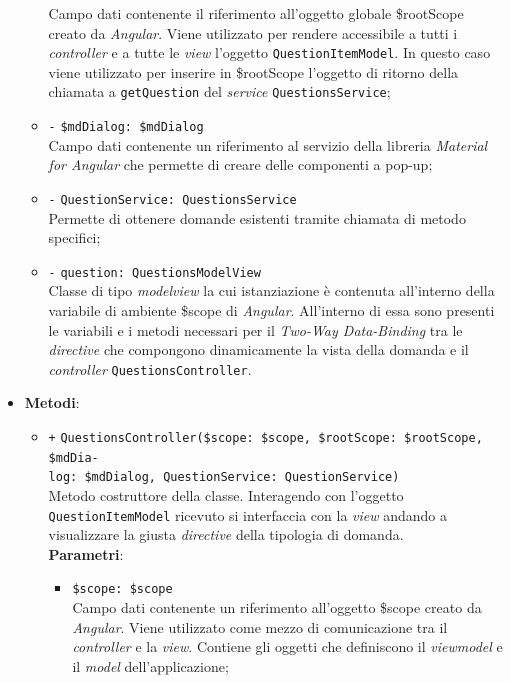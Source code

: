 \begin{itemize}
\begin{itemize}
		Campo dati contenente il riferimento all'oggetto globale \$rootScope creato da \textit{Angular}. Viene utilizzato per rendere accessibile a tutti i \textit{controller} e a tutte le \textit{view} l'oggetto \texttt{QuestionItemModel}. In questo caso viene utilizzato per inserire in \$rootScope l'oggetto di ritorno della chiamata a \texttt{getQuestion} del \textit{service} \texttt{QuestionsService};
		\item \texttt{-} \texttt{\$mdDialog: \$mdDialog} \\
		Campo dati contenente un riferimento al servizio della libreria \textit{Material for Angular} che permette di creare delle componenti a pop-up;
		\item \texttt{-} \texttt{QuestionService: QuestionsService}\\ Permette di ottenere domande esistenti tramite chiamata di metodo specifici;
		\item \texttt{-} \texttt{question: QuestionsModelView} \\
		Classe di tipo \textit{modelview} la cui istanziazione è contenuta all'interno della variabile di ambiente \$scope di \textit{Angular}. All'interno di essa sono presenti le variabili e i metodi necessari per il \textit{Two-Way Data-Binding} tra le \textit{directive} che compongono dinamicamente la vista della domanda e il \textit{controller} \texttt{QuestionsController}.
	\end{itemize}
	\item \textbf{Metodi}:
	\begin{itemize}
		\item \texttt{+} \texttt{QuestionsController(\$scope: \$scope, \$rootScope: \$rootScope, \$mdDia-\\log: \$mdDialog, QuestionService: QuestionService)} \\ Metodo costruttore della classe. Interagendo con l'oggetto \texttt{QuestionItemModel} ricevuto si interfaccia con la \textit{view} andando a visualizzare la giusta \textit{directive} della tipologia di domanda. \\
		\textbf{Parametri}:
		\begin{itemize}
			\item \texttt{\$scope: \$scope} \\
			Campo dati contenente un riferimento all'oggetto \$scope creato da \textit{Angular}. Viene utilizzato come mezzo di comunicazione tra il \textit{controller} e la \textit{view}. Contiene gli oggetti che definiscono il \textit{viewmodel} e il \textit{model} dell'applicazione;

\end{itemize}
\end{itemize}
\end{itemize}
